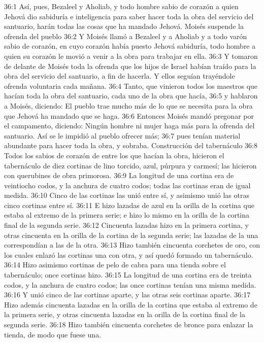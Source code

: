 36:1 Así, pues, Bezaleel y Aholiab, y todo hombre sabio de corazón a quien Jehová dio sabiduría e inteligencia para saber hacer toda la obra del servicio del santuario, harán todas las cosas que ha mandado Jehová. 
Moisés suspende la ofrenda del pueblo 
36:2 Y Moisés llamó a Bezaleel y a Aholiab y a todo varón sabio de corazón, en cuyo corazón había puesto Jehová sabiduría, todo hombre a quien su corazón le movió a venir a la obra para trabajar en ella. 
36:3 Y tomaron de delante de Moisés toda la ofrenda que los hijos de Israel habían traído para la obra del servicio del santuario, a fin de hacerla. Y ellos seguían trayéndole ofrenda voluntaria cada mañana. 
36:4 Tanto, que vinieron todos los maestros que hacían toda la obra del santuario, cada uno de la obra que hacía, 
36:5 y hablaron a Moisés, diciendo: El pueblo trae mucho más de lo que se necesita para la obra que Jehová ha mandado que se haga. 
36:6 Entonces Moisés mandó pregonar por el campamento, diciendo: Ningún hombre ni mujer haga más para la ofrenda del santuario. Así se le impidió al pueblo ofrecer más; 
36:7 pues tenían material abundante para hacer toda la obra, y sobraba. 
Construcción del tabernáculo  
36:8 Todos los sabios de corazón de entre los que hacían la obra, hicieron el tabernáculo de diez cortinas de lino torcido, azul, púrpura y carmesí; las hicieron con querubines de obra primorosa. 
36:9 La longitud de una cortina era de veintiocho codos, y la anchura de cuatro codos; todas las cortinas eran de igual medida. 
36:10 Cinco de las cortinas las unió entre sí, y asimismo unió las otras cinco cortinas entre sí. 
36:11 E hizo lazadas de azul en la orilla de la cortina que estaba al extremo de la primera serie; e hizo lo mismo en la orilla de la cortina final de la segunda serie. 
36:12 Cincuenta lazadas hizo en la primera cortina, y otras cincuenta en la orilla de la cortina de la segunda serie; las lazadas de la una correspondían a las de la otra. 
36:13 Hizo también cincuenta corchetes de oro, con los cuales enlazó las cortinas una con otra, y así quedó formado un tabernáculo. 
36:14 Hizo asimismo cortinas de pelo de cabra para una tienda sobre el tabernáculo; once cortinas hizo. 
36:15 La longitud de una cortina era de treinta codos, y la anchura de cuatro codos; las once cortinas tenían una misma medida. 
36:16 Y unió cinco de las cortinas aparte, y las otras seis cortinas aparte. 
36:17 Hizo además cincuenta lazadas en la orilla de la cortina que estaba al extremo de la primera serie, y otras cincuenta lazadas en la orilla de la cortina final de la segunda serie. 
36:18 Hizo también cincuenta corchetes de bronce para enlazar la tienda, de modo que fuese una. 
